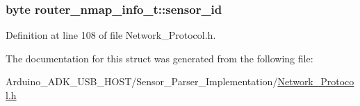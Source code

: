 \hypertarget{structrouter__nmap__info__t_a14d6e480e14c770acb5b1981b3e5b186}{
\subsubsection[{sensor\-\_\-id}]{\setlength{\rightskip}{0pt plus 5cm}byte router\-\_\-nmap\-\_\-info\-\_\-t\-::sensor\-\_\-id}}\label{structrouter__nmap__info__t_a14d6e480e14c770acb5b1981b3e5b186}


Definition at line 108 of file Network\-\_\-\-Protocol.\-h.



The documentation for this struct was generated from the following file\-:\begin{DoxyCompactItemize}
\item 
Arduino\-\_\-\-A\-D\-K\-\_\-\-U\-S\-B\-\_\-\-H\-O\-S\-T/\-Sensor\-\_\-\-Parser\-\_\-\-Implementation/\hyperlink{_network___protocol_8h}{Network\-\_\-\-Protocol.\-h}\end{DoxyCompactItemize}

